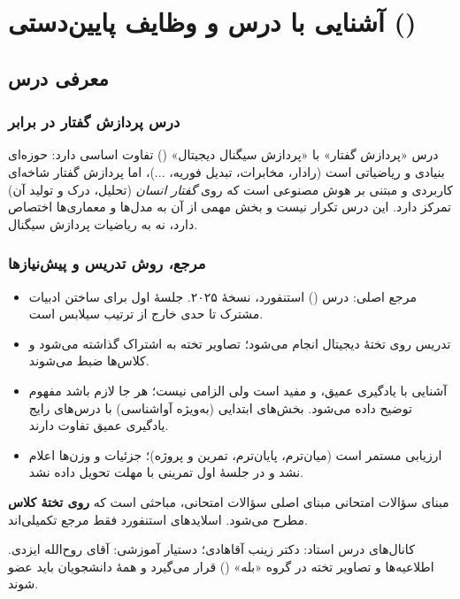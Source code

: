 \chapter{آشنایی با درس و وظایف پایین‌دستی ()}

\section{معرفی درس}

\subsection{درس پردازش گفتار در برابر }
درس «پردازش گفتار» با «پردازش سیگنال دیجیتال» () تفاوت اساسی دارد:  حوزه‌ای بنیادی و ریاضیاتی است (رادار، مخابرات، تبدیل فوریه، ...)، اما پردازش گفتار شاخه‌ای کاربردی و مبتنی بر هوش مصنوعی است که روی \emph{گفتار انسان} (تحلیل، درک و تولید آن) تمرکز دارد. این درس تکرار  نیست و بخش مهمی از آن به مدل‌ها و معماری‌ها اختصاص دارد، نه به ریاضیات پردازش سیگنال.

\subsection{مرجع، روش تدریس و پیش‌نیازها}
\begin{itemize}
  \item مرجع اصلی: درس  () استنفورد، نسخهٔ ۲۰۲۵. جلسهٔ اول برای ساختن ادبیات مشترک تا حدی خارج از ترتیب سیلابس است.
  \item تدریس روی تختهٔ دیجیتال  انجام می‌شود؛ تصاویر تخته به اشتراک گذاشته می‌شود و کلاس‌ها ضبط می‌شوند.
  \item آشنایی با یادگیری عمیق،  و  مفید است ولی الزامی نیست؛ هر جا لازم باشد مفهوم توضیح داده می‌شود. بخش‌های ابتدایی (به‌ویژه آواشناسی) با درس‌های رایج یادگیری عمیق تفاوت دارند.
  \item ارزیابی مستمر است (میان‌ترم، پایان‌ترم، تمرین و پروژه)؛ جزئیات و وزن‌ها اعلام نشد و در جلسهٔ اول تمرینی با مهلت تحویل داده نشد.
\end{itemize}

\begin{exambox}{مبنای سؤالات امتحانی}
مبنای اصلی سؤالات امتحانی، مباحثی است که \textbf{روی تختهٔ کلاس} مطرح می‌شود. اسلایدهای استنفورد فقط مرجع تکمیلی‌اند.
\end{exambox}

\begin{exambox}{کانال‌های درس}
استاد: دکتر زینب آقاهادی؛ دستیار آموزشی: آقای روح‌الله ایزدی. اطلاعیه‌ها و تصاویر تخته در گروه «بله» () قرار می‌گیرد و همهٔ دانشجویان باید عضو شوند.
\end{exambox}

